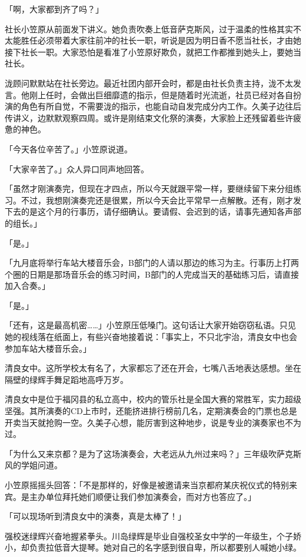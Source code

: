 \documentclass[UTF8]{ctexart}
\begin{document}
    「啊，大家都到齐了吗？」 

    社长小笠原从前面发下讲义。她负责吹奏上低音萨克斯风，过于温柔的性格其实不太能胜任必须带着大家往前冲的社长一职，听说是因为明日香不愿当社长，才由她接下社长一职。大家恐怕是看准了小笠原好欺负，就把工作都推到她头上，要她当社长。 

    泷顾问默默站在社长旁边。最近社团内部开会时，都是由社长负责主持，泷不太发言。他刚上任时，会做出巨细靡遗的指示，但是随着时光流逝，社员已经对各自扮演的角色有所自觉，不需要泷的指示，也能自动自发完成分内工作。久美子边往后传讲义，边默默观察四周。或许是刚结束文化祭的演奏，大家脸上还残留着些许疲惫的神色。 

    「今天各位辛苦了。」小笠原说道。 

    「大家辛苦了。」众人异口同声地回答。 

    「虽然才刚演奏完，但现在才四点，所以今天就跟平常一样，要继续留下来分组练习。不过，我想刚演奏完还是很累，所以今天会比平常早一点解散。还有，刚才发下去的是这个月的行事历，请仔细确认。要请假、会迟到的话，请事先通知各声部的组长。」 

    「是。」 

    「九月底将举行车站大楼音乐会，B部门的人请以那边的练习为主。行事历上打两个圈的日期是那场音乐会的练习时间，B部门的人完成当天的基础练习后，请直接加入合奏。」 

    「是。」 

    「还有，这是最高机密……」小笠原压低嗓门。这句话让大家开始窃窃私语。只见她的视线落在纸面上，有些兴奋地接着说：「事实上，不只北宇治，清良女中也会参加车站大楼音乐会。」 

    清良女中。这所学校太有名了，大家都忘了还在开会，七嘴八舌地表达感想。坐在隔壁的绿辉手舞足蹈地高呼万岁。 

    清良女中是位于福冈县的私立高中，校内的管乐社是全国大赛的常胜军，实力超级坚强。其所演奏的CD上市时，还能挤进排行榜前几名，定期演奏会的门票也总是开卖当天就抢购一空。久美子心想，能厉害到这种地步，说是专业的演奏家也不为过。 

    「为什么又来京都？是为了这场演奏会，大老远从九州过来吗？」三年级吹萨克斯风的学姐问道。 

    小笠原摇摇头回答：「不是那样的，好像是被邀请来当京都府某庆祝仪式的特别来宾。是主办单位拜托她们顺便让我们参加演奏会，而对方也答应了。」 

    「可以现场听到清良女中的演奏，真是太棒了！」 

    强校迷绿辉兴奋地握紧拳头。川岛绿辉是毕业自强校圣女中学的一年级生，个子娇小，却负责拉低音大提琴。她对自己的名字感到很自卑，所以都要别人喊她小绿。 
\end{document}
